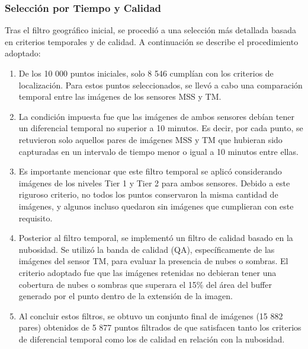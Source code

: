             \subsubsection{Selección por Tiempo y Calidad}
                Tras el filtro geográfico inicial, se procedió a una selección más detallada basada en criterios temporales y de calidad. A continuación se describe el procedimiento adoptado:
                
                \begin{enumerate}
                    \item De los 10 000 puntos iniciales, solo 8 546 cumplían con los criterios de localización. Para estos puntos seleccionados, se llevó a cabo una comparación temporal entre las imágenes de los sensores MSS y TM.
                
                    \item La condición impuesta fue que las imágenes de ambos sensores debían tener un diferencial temporal no superior a 10 minutos. Es decir, por cada punto, se retuvieron solo aquellos pares de imágenes MSS y TM que hubieran sido capturadas en un intervalo de tiempo menor o igual a 10 minutos entre ellas.
                    
                    \item Es importante mencionar que este filtro temporal se aplicó considerando imágenes de los niveles Tier 1 y Tier 2 para ambos sensores. Debido a este riguroso criterio, no todos los puntos conservaron la misma cantidad de imágenes, y algunos incluso quedaron sin imágenes que cumplieran con este requisito.
                    
                    \item Posterior al filtro temporal, se implementó un filtro de calidad basado en la nubosidad. Se utilizó la banda de calidad (QA), específicamente de las imágenes del sensor TM, para evaluar la presencia de nubes o sombras. El criterio adoptado fue que las imágenes retenidas no debieran tener una cobertura de nubes o sombras que superara el 15\% del área del buffer generado por el punto dentro de la extensión de la imagen.
                    
                    \item Al concluir estos filtros, se obtuvo un conjunto final de imágenes (15 882 pares) obtenidos de 5 877 puntos filtrados de  que satisfacen tanto los criterios de diferencial temporal como los de calidad en relación con la nubosidad.
                \end{enumerate}
                
